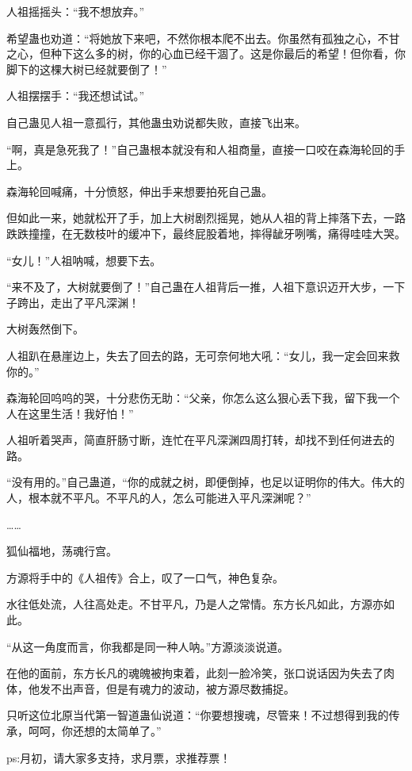 \begin{this_body}
人祖摇摇头：“我不想放弃。”

希望蛊也劝道：“将她放下来吧，不然你根本爬不出去。你虽然有孤独之心，不甘之心，但种下这么多的树，你的心血已经干涸了。这是你最后的希望！但你看，你脚下的这棵大树已经就要倒了！”

人祖摆摆手：“我还想试试。”

自己蛊见人祖一意孤行，其他蛊虫劝说都失败，直接飞出来。

“啊，真是急死我了！”自己蛊根本就没有和人祖商量，直接一口咬在森海轮回的手上。

森海轮回喊痛，十分愤怒，伸出手来想要拍死自己蛊。

但如此一来，她就松开了手，加上大树剧烈摇晃，她从人祖的背上摔落下去，一路跌跌撞撞，在无数枝叶的缓冲下，最终屁股着地，摔得龇牙咧嘴，痛得哇哇大哭。

“女儿！”人祖呐喊，想要下去。

“来不及了，大树就要倒了！”自己蛊在人祖背后一推，人祖下意识迈开大步，一下子跨出，走出了平凡深渊！

大树轰然倒下。

人祖趴在悬崖边上，失去了回去的路，无可奈何地大吼：“女儿，我一定会回来救你的。”

森海轮回呜呜的哭，十分悲伤无助：“父亲，你怎么这么狠心丢下我，留下我一个人在这里生活！我好怕！”

人祖听着哭声，简直肝肠寸断，连忙在平凡深渊四周打转，却找不到任何进去的路。

“没有用的。”自己蛊道，“你的成就之树，即便倒掉，也足以证明你的伟大。伟大的人，根本就不平凡。不平凡的人，怎么可能进入平凡深渊呢？”

……

狐仙福地，荡魂行宫。

方源将手中的《人祖传》合上，叹了一口气，神色复杂。

水往低处流，人往高处走。不甘平凡，乃是人之常情。东方长凡如此，方源亦如此。

“从这一角度而言，你我都是同一种人呐。”方源淡淡说道。

在他的面前，东方长凡的魂魄被拘束着，此刻一脸冷笑，张口说话因为失去了肉体，他发不出声音，但是有魂力的波动，被方源尽数捕捉。

只听这位北原当代第一智道蛊仙说道：“你要想搜魂，尽管来！不过想得到我的传承，呵呵，你还想的太简单了。”

ps:月初，请大家多支持，求月票，求推荐票！

\end{this_body}

